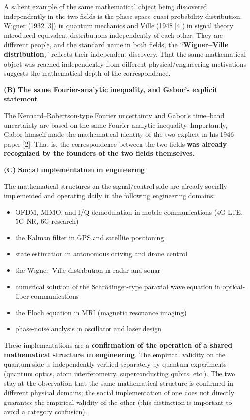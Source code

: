 \documentclass[
]{article}
\providecommand{\tightlist}{%
  \setlength{\itemsep}{0pt}\setlength{\parskip}{0pt}}
\begin{document}
A salient example of the same mathematical object being discovered
independently in the two fields is the phase-space quasi-probability
distribution. Wigner (1932 {[}3{]}) in quantum mechanics and Ville (1948
{[}4{]}) in signal theory introduced equivalent distributions
independently of each other. They are different people, and the standard
name in both fields, the ``\textbf{Wigner--Ville distribution},''
reflects their independent discovery. That the same mathematical object
was reached independently from different physical/engineering
motivations suggests the mathematical depth of the correspondence.

\textbf{(B) The same Fourier-analytic inequality, and Gabor's explicit
statement}

The Kennard--Robertson-type Fourier uncertainty and Gabor's time--band
uncertainty are based on the same Fourier-analytic inequality.
Importantly, Gabor himself made the mathematical identity of the two
explicit in his 1946 paper {[}2{]}. That is, the correspondence between
the two fields \textbf{was already recognized by the founders of the two
fields themselves.}

\textbf{(C) Social implementation in engineering}

The mathematical structures on the signal/control side are already
socially implemented and operating daily in the following engineering
domains:

\begin{itemize}
\tightlist
\item
  OFDM, MIMO, and I/Q demodulation in mobile communications (4G LTE, 5G
  NR, 6G research)
\item
  the Kalman filter in GPS and satellite positioning
\item
  state estimation in autonomous driving and drone control
\item
  the Wigner--Ville distribution in radar and sonar
\item
  numerical solution of the Schrödinger-type paraxial wave equation in
  optical-fiber communications
\item
  the Bloch equation in MRI (magnetic resonance imaging)
\item
  phase-noise analysis in oscillator and laser design
\end{itemize}

These implementations are a \textbf{confirmation of the operation of a
shared mathematical structure in engineering}. The empirical validity on
the quantum side is independently verified separately by quantum
experiments (quantum optics, atom interferometry, superconducting
qubits, etc.). The two stay at the observation that the same
mathematical structure is confirmed in different physical domains; the
social implementation of one does not directly guarantee the empirical
validity of the other (this distinction is important to avoid a category
confusion).
\end{document}
